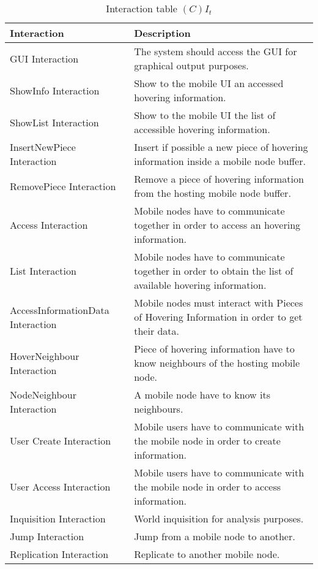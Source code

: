 \begin{table}[H]
	\centering
	\begin{tabular}{|p{4cm}|p{8cm}|}
			\hline
			\textbf{Interaction} & \textbf{Description} \\
			\hline
			GUI Interaction & The system should access the GUI for graphical output
			purposes. \\
			\hline
			ShowInfo Interaction & Show to the mobile UI an accessed hovering
			information. \\
			\hline
			ShowList Interaction & Show to the mobile UI the list of accessible hovering
			information. \\
			\hline
			InsertNewPiece Interaction & Insert if possible a new piece of hovering
			information inside a mobile node buffer. \\
			\hline
			RemovePiece Interaction & Remove a piece of hovering information from the
			hosting mobile node buffer. \\
			\hline
			Access Interaction & Mobile nodes have to communicate together in order to
			access an hovering information. \\
			\hline
			List Interaction & Mobile nodes have to communicate together in order to
			obtain the list of available hovering information. \\
			\hline
			AccessInformationData Interaction & Mobile nodes must interact with Pieces
			of Hovering Information in order to get their data. \\
			\hline
			HoverNeighbour Interaction & Piece of hovering information have to know
			neighbours of the hosting mobile node. \\
			\hline
			NodeNeighbour Interaction & A mobile node have to know its neighbours. \\
			\hline
			User Create Interaction & Mobile users have to communicate with the
			mobile node in order to create information. \\
			\hline
			User Access Interaction & Mobile users have to communicate with the
			mobile node in order to access information. \\
			\hline
			Inquisition Interaction & World inquisition for analysis purposes. \\
			\hline
			Jump Interaction & Jump from a mobile node to another. \\
			\hline
			Replication Interaction & Replicate to another mobile node. \\
			\hline
		\end{tabular}
	\caption{Interaction table $(C)I_t$}
	\label{tab:cit}
\end{table}

